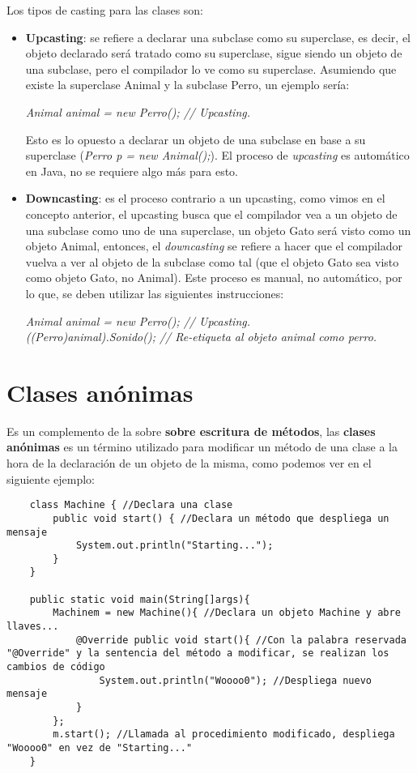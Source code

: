 Los tipos de casting para las clases son:
\begin{itemize}
    \item \textbf{Upcasting}: se refiere a declarar una subclase como su superclase, es decir, el objeto declarado será tratado como su superclase, sigue siendo un objeto de una subclase, pero el compilador lo ve como su superclase. Asumiendo que existe la superclase Animal y la subclase Perro, un ejemplo sería:
    \begin{center}
        \textit{Animal animal = new Perro(); // Upcasting.}
    \end{center}
    Esto es lo opuesto a declarar un objeto de una subclase en base a su superclase (\textit{Perro p = new Animal();}). El proceso de \textit{upcasting} es automático en Java, no se requiere algo más para esto.
    \item \textbf{Downcasting}: es el proceso contrario a un upcasting, como vimos en el concepto anterior, el upcasting busca que el compilador vea a un objeto de una subclase como uno de una superclase, un objeto Gato será         visto como un objeto Animal, entonces, el \textit{downcasting} se refiere a hacer que el compilador vuelva a ver al objeto de la subclase como tal (que el objeto Gato sea visto como objeto Gato, no Animal). Este         proceso es manual, no automático, por lo que, se deben utilizar las siguientes instrucciones:
    \begin{center}
        \textit{
            Animal animal = new Perro(); // Upcasting. \\
            ((Perro)animal).Sonido(); // Re-etiqueta al objeto animal como perro.
        }
    \end{center}
\end{itemize}



\section{Clases anónimas}
\hspace{0.55cm}Es un complemento de la sobre \textbf{sobre escritura de métodos}, las \textbf{clases anónimas} es un término utilizado para modificar un método de una clase a la hora de la declaración de un objeto de la misma, como podemos ver en el siguiente ejemplo:
\begin{lstlisting}
    class Machine { //Declara una clase
        public void start() { //Declara un método que despliega un mensaje
            System.out.println("Starting...");
        }
    }
    
    public static void main(String[]args){
        Machinem = new Machine(){ //Declara un objeto Machine y abre llaves...
            @Override public void start(){ //Con la palabra reservada "@Override" y la sentencia del método a modificar, se realizan los cambios de código
                System.out.println("Woooo0"); //Despliega nuevo mensaje
            }
        };
        m.start(); //Llamada al procedimiento modificado, despliega "Woooo0" en vez de "Starting..."
    }
\end{lstlisting}

